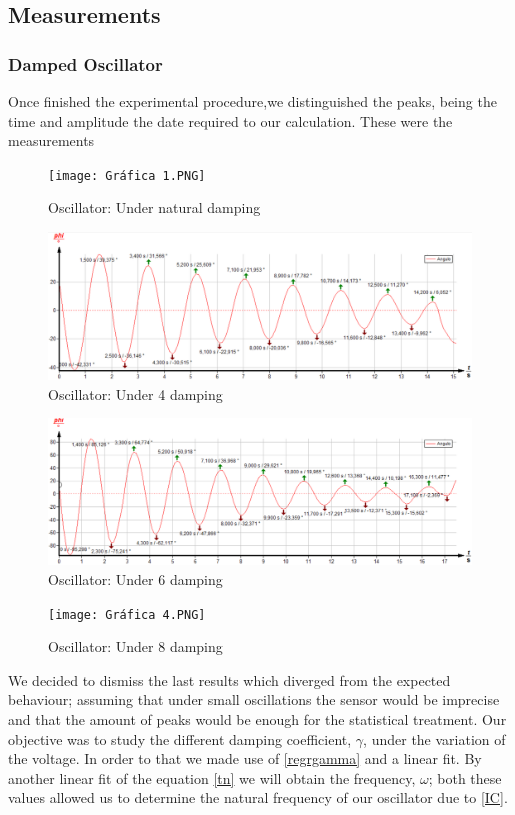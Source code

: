 \documentclass[a4paper,12pt]{article}
\begin{document}
\subsection{Measurements}

\subsubsection{Damped Oscillator}\label{damped}
Once finished the experimental procedure,we distinguished the peaks, being the time and amplitude the date required to our calculation. These were the measurements
\newpage
\begin{figure}[h!]
    \centering
    \texttt{[image: Gráfica 1.PNG]}
    \caption{Oscillator: Under natural damping}
    \label{fig:nodamping
    }
\end{figure}
\begin{figure}[h!]
    \centering
    \includegraphics[scale=0.5]{Grafica 2.PNG}
    \caption{Oscillator: Under 4 damping}
    \label{fig:4vdamping
    }
\end{figure}
\begin{figure}[h!]
    \centering
    \includegraphics[scale=0.5]{Grafica 3.PNG}
    \caption{Oscillator: Under 6 damping}
    \label{fig:6vdamping
    }
\end{figure}
\begin{figure}[h!]
    \centering
    \texttt{[image: Gráfica 4.PNG]}
    \caption{Oscillator: Under 8 damping}
    \label{fig:8vdamping
    }
\end{figure}
\pagebreak
We decided to dismiss the last results which diverged from the expected behaviour; assuming that under small oscillations the sensor would be imprecise and that the amount of peaks would be enough for the statistical treatment.
Our objective was to study the different damping coefficient, $\gamma$, under the variation of the voltage. In order to that we made use of \eqref{regrgamma} and a linear fit. By another linear fit of the equation \eqref{tn} we will obtain the frequency, $\omega$; both these values allowed us to determine the natural frequency of our oscillator due to \eqref{IC}.
\end{document}
